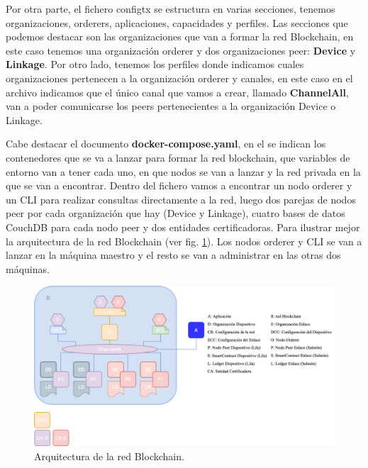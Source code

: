 \vspace{10mm}

\noindent Por otra parte, el fichero configtx se estructura en varias secciones, tenemos organizaciones, orderers,  
aplicaciones, capacidades y perfiles. Las secciones que podemos destacar son las organizaciones que van a formar la red 
Blockchain, en este caso tenemos una organización orderer y dos organizaciones peer: \textbf{Device} y \textbf{Linkage}. 
Por otro lado, tenemos los perfiles donde indicamos cuales organizaciones pertenecen a la organización orderer y canales, 
en este caso en el archivo indicamos que el único canal que vamos a crear, llamado \textbf{ChannelAll}, van a poder 
comunicarse los peers pertenecientes a la organización Device o Linkage.

\vspace{5mm}

\noindent Cabe destacar el documento \textbf{docker-compose.yaml}, en el se indican los contenedores que se va a lanzar 
para formar la red blockchain, que variables de entorno van a tener cada uno, en que nodos se van a lanzar y la red 
privada en la que se van a encontrar. Dentro del fichero vamos a encontrar un nodo orderer y un CLI para realizar 
consultas directamente a la red, luego dos parejas de nodos peer por cada organización que hay (Device y Linkage), 
cuatro bases de datos CouchDB para cada nodo peer y dos entidades certificadoras. Para ilustrar mejor la arquitectura de 
la red Blockchain (ver fig. \ref{fig:arquitectura-blockchain}). Los nodos orderer y CLI se van a lanzar en la máquina 
maestro y el resto se van a administrar en las otras dos máquinas.

\begin{figure}[h!]
  \centering
  \includegraphics[width=\textwidth]{imagenes/desarrollo/arquitectura_networkiot}
  \caption{Arquitectura de la red Blockchain.}
  \label{fig:arquitectura-blockchain}
\end{figure}

